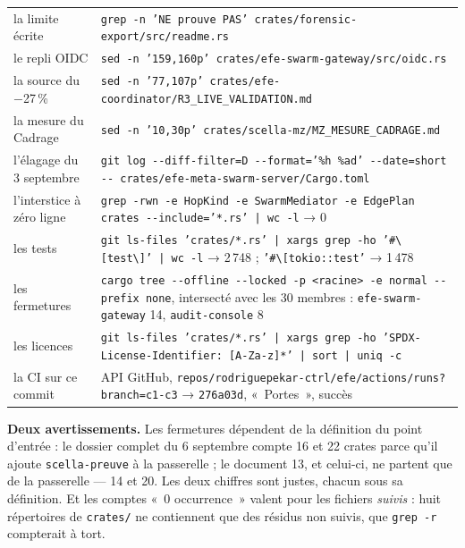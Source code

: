\documentclass[10pt]{article}
\newcommand{\code}[1]{\texttt{\small #1}}
\newcommand{\pc}{\,\%}
\begin{document}
{\begin{longtable}{@{}L{4.4cm}L{12.8cm}@{}}
la limite écrite & \code{grep -n 'NE prouve PAS' crates/forensic-export/src/readme.rs} \\
le repli OIDC & \code{sed -n '159,160p' crates/efe-swarm-gateway/src/oidc.rs} \\
la source du $-$27\pc{} & \code{sed -n '77,107p' crates/efe-coordinator/R3\_LIVE\_VALIDATION.md} \\
la mesure du Cadrage & \code{sed -n '10,30p' crates/scella-mz/MZ\_MESURE\_CADRAGE.md} \\
l'élagage du 3 septembre & \code{git log -{}-diff-filter=D -{}-format='\%h \%ad' -{}-date=short -{}- crates/efe-meta-swarm-server/Cargo.toml} \\
l'interstice à zéro ligne & \code{grep -rwn -e HopKind -e SwarmMediator -e EdgePlan crates -{}-include='*.rs' | wc -l} → 0 \\
les tests & \code{git ls-files 'crates/*.rs' | xargs grep -ho '\#\textbackslash{}[test\textbackslash{}]' | wc -l} → 2\,748 ; \code{'\#\textbackslash{}[tokio::test'} → 1\,478 \\
les fermetures & \code{cargo tree -{}-offline -{}-locked -p <racine> -e normal -{}-prefix none}, intersecté avec les 30 membres : \code{efe-swarm-gateway} 14, \code{audit-console} 8 \\
les licences & \code{git ls-files 'crates/*.rs' | xargs grep -ho 'SPDX-License-Identifier: [A-Za-z]*' | sort | uniq -c} \\
la CI sur ce commit & API GitHub, \code{repos/rodriguepekar-ctrl/efe/actions/runs?branch=c1-c3} → \code{276a03d}, «~Portes~», succès \\
\bottomrule
\end{longtable}
}

\textbf{Deux avertissements.} Les fermetures dépendent de la définition du point d'entrée : le dossier complet du
6 septembre compte 16 et 22 crates parce qu'il ajoute \code{scella-preuve} à la passerelle ; le document 13, et celui-ci, ne
partent que de la passerelle --- 14 et 20. Les deux chiffres sont justes, chacun sous sa définition. Et les
comptes «~0 occurrence~» valent pour les fichiers \emph{suivis} : huit répertoires de \code{crates/} ne contiennent
que des résidus non suivis, que \code{grep -r} compterait à tort.
\end{document}
